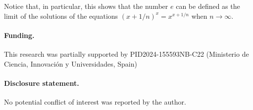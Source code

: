 \documentclass[11pt, a4paper]{article}
\begin{document}
Notice that, in particular, this shows that the number $e$ can be defined as the limit of the solutions of the equations $(x+1/n)^x = x^{x+1/n}$ when $n\to \infty$.

\paragraph{Funding.} This research was partially supported by PID2024-155593NB-C22 (Mi\-nis\-te\-rio de Cien\-cia, Inno\-va\-ci\'on y Uni\-ver\-si\-da\-des, Spain)

\paragraph{Disclosure statement.} No potential conflict of interest was reported by the author.
\end{document}
